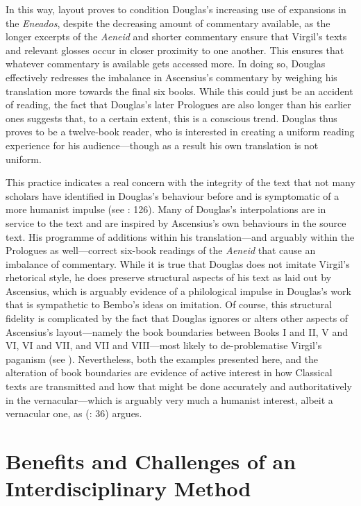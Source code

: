 \documentclass{dhbenelux}
\begin{document}
In this way, layout proves to condition Douglas's increasing use of
expansions in the \emph{Eneados}, despite the decreasing amount of
commentary available, as the longer excerpts of the \emph{Aeneid} and
shorter commentary ensure that Virgil's texts and relevant glosses occur
in closer proximity to one another. This ensures that whatever
commentary is available gets accessed more. In doing so, Douglas
effectively redresses the imbalance in Ascensius's commentary by
weighing his translation more towards the final six books. While this
could just be an accident of reading, the fact that Douglas's later
Prologues are also longer than his earlier ones suggests that, to a
certain extent, this is a conscious trend. Douglas thus proves to be a
twelve-book reader, who is interested in creating a uniform reading
experience for his audience---though as a result his own translation is
not uniform.

This practice indicates a real concern with the integrity of the text
that not many scholars have identified in Douglas's behaviour before and
is symptomatic of a more humanist impulse (see \citeauthor{royan2015} \citeyear{royan2015}: 126). Many of
Douglas's interpolations are in service to the text and are inspired by
Ascensius's own behaviours in the source text. His programme of
additions within his translation---and arguably within the Prologues as
well---correct six-book readings of the \emph{Aeneid} that cause an
imbalance of commentary. While it is true that Douglas does not imitate
Virgil's rhetorical style, he does preserve structural aspects of his
text as laid out by Ascensius, which is arguably evidence of a
philological impulse in Douglas's work that is sympathetic to Bembo's
ideas on imitation. Of course, this structural fidelity is complicated
by the fact that Douglas ignores or alters other aspects of Ascensius's
layout---namely the book boundaries between Books I and II, V and VI, VI
and VII, and VII and VIII---most likely to de-problematise Virgil's
paganism (see \citeauthor{royan2015} \citeyear{royan2015}). Nevertheless, both the examples presented
here, and the alteration of book boundaries are evidence of active
interest in how Classical texts are transmitted and how that might be
done accurately and authoritatively in the vernacular---which is
arguably very much a humanist interest, albeit a vernacular one, as
\citeauthor{bawcutt1976} (\citeyear{bawcutt1976}: 36) argues.

\section{Benefits and Challenges of an Interdisciplinary Method}
\end{document}
